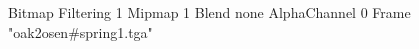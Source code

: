 {Bitmap
	{Filtering 1}
	{Mipmap 1}
	{Blend none}
	{AlphaChannel 0}
	{Frame "oak2osen#spring1.tga"}
}

